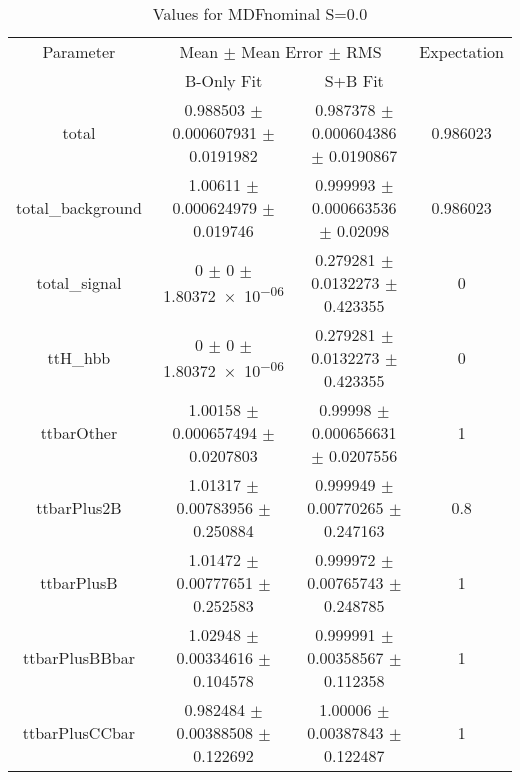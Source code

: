 \begin{table}
\centering
\caption{Values for MDFnominal S=0.0}
\begin{tabular}{cccc}
\toprule
Parameter & \multicolumn{2}{c}{Mean $\pm$ Mean Error $\pm$ RMS} & Expectation\\
 & B-Only Fit & S+B Fit & \\
\midrule
total & \num{0.988503} $\pm$ \num{0.000607931} $\pm$ \num{0.0191982} & \num{0.987378} $\pm$ \num{0.000604386} $\pm$ \num{0.0190867} & \num{0.986023}\\
total\_background & \num{1.00611} $\pm$ \num{0.000624979} $\pm$ \num{0.019746} & \num{0.999993} $\pm$ \num{0.000663536} $\pm$ \num{0.02098} & \num{0.986023}\\
total\_signal & \num{0} $\pm$ \num{0} $\pm$ \num{1.80372e-06} & \num{0.279281} $\pm$ \num{0.0132273} $\pm$ \num{0.423355} & \num{0}\\
ttH\_hbb & \num{0} $\pm$ \num{0} $\pm$ \num{1.80372e-06} & \num{0.279281} $\pm$ \num{0.0132273} $\pm$ \num{0.423355} & \num{0}\\
ttbarOther & \num{1.00158} $\pm$ \num{0.000657494} $\pm$ \num{0.0207803} & \num{0.99998} $\pm$ \num{0.000656631} $\pm$ \num{0.0207556} & \num{1}\\
ttbarPlus2B & \num{1.01317} $\pm$ \num{0.00783956} $\pm$ \num{0.250884} & \num{0.999949} $\pm$ \num{0.00770265} $\pm$ \num{0.247163} & \num{0.8}\\
ttbarPlusB & \num{1.01472} $\pm$ \num{0.00777651} $\pm$ \num{0.252583} & \num{0.999972} $\pm$ \num{0.00765743} $\pm$ \num{0.248785} & \num{1}\\
ttbarPlusBBbar & \num{1.02948} $\pm$ \num{0.00334616} $\pm$ \num{0.104578} & \num{0.999991} $\pm$ \num{0.00358567} $\pm$ \num{0.112358} & \num{1}\\
ttbarPlusCCbar & \num{0.982484} $\pm$ \num{0.00388508} $\pm$ \num{0.122692} & \num{1.00006} $\pm$ \num{0.00387843} $\pm$ \num{0.122487} & \num{1}\\
\bottomrule
\end{tabular}
\end{table}